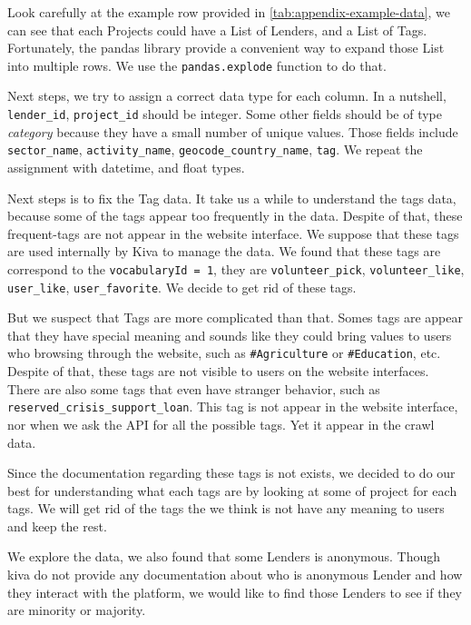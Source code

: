 Look carefully at the example row provided in \ref{tab:appendix-example-data},
we can see that each Projects could have a List of Lenders, and a List of Tags.
Fortunately, the pandas library provide a convenient way to expand those List into multiple rows.
We use the \lstinline|pandas.explode| function to do that.

Next steps, we try to assign a correct data type for each column.
In a nutshell, \lstinline|lender_id|, \lstinline|project_id| should be integer.
Some other fields should be of type \textit{category} because they have a small number of unique values.
Those fields include \lstinline|sector_name|, \lstinline|activity_name|, \lstinline|geocode_country_name|, \lstinline|tag|.
We repeat the assignment with datetime, and float types.

Next steps is to fix the Tag data.
It take us a while to understand the tags data, because some of the tags appear too frequently in the data.
Despite of that, these frequent-tags are not appear in the website interface.
We suppose that these tags are used internally by Kiva to manage the data.
We found that these tags are correspond to the \lstinline|vocabularyId = 1|,
they are \lstinline|volunteer_pick|, \lstinline|volunteer_like|, \lstinline|user_like|, \lstinline|user_favorite|.
We decide to get rid of these tags.

But we suspect that Tags are more complicated than that.
Somes tags are appear that they have special meaning and sounds like they could bring values to users who browsing through the website,
such as \lstinline|#Agriculture| or \lstinline|#Education|, etc.
Despite of that, these tags are not visible to users on the website interfaces.
There are also some tags that even have stranger behavior, such as \lstinline|reserved_crisis_support_loan|.
This tag is not appear in the website interface, nor when we ask the API for all the possible tags.
Yet it appear in the crawl data.

Since the documentation regarding these tags is not exists,
we decided to do our best for understanding what each tags are by looking at some of project for each tags.
We will get rid of the tags the we think is not have any meaning to users and keep the rest.



We explore the data, we also found that some Lenders is anonymous.
Though kiva do not provide any documentation about who is anonymous Lender and how they interact with the platform,
we would like to find those Lenders to see if they are minority or majority.

